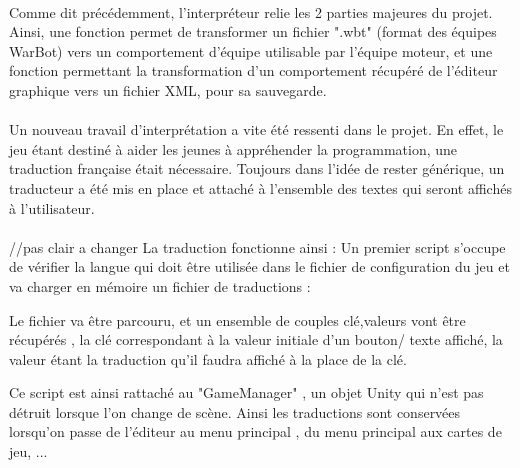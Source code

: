 \documentclass{report}
\begin{document}
\paragraph{}
Comme dit précédemment, l'interpréteur relie les 2 parties majeures du projet.
Ainsi, une fonction permet de transformer un fichier ".wbt" (format des équipes WarBot) vers un comportement d'équipe utilisable par l'équipe moteur, et une fonction permettant la transformation d'un comportement récupéré de l'éditeur graphique vers un fichier XML, pour sa sauvegarde.
\newpage
\paragraph{}
Un nouveau travail d'interprétation a vite été ressenti dans le projet. En effet, le jeu étant destiné à aider les jeunes à appréhender la programmation, une traduction française était nécessaire.
Toujours dans l'idée de rester générique, un traducteur a été mis en place et attaché à l'ensemble des textes qui seront affichés à l'utilisateur.
\paragraph{}
//pas clair a changer
La traduction fonctionne ainsi :
Un premier script s'occupe de vérifier la langue qui doit être utilisée dans le fichier de configuration du jeu et va charger en mémoire un fichier  de traductions : 

Le fichier va être parcouru, et un ensemble de couples clé,valeurs vont être récupérés , la clé correspondant à la valeur initiale d'un bouton/ texte affiché, la valeur étant la traduction qu'il faudra affiché à la place de la clé.

Ce script est ainsi rattaché au "GameManager" , un objet Unity qui n'est pas détruit lorsque l'on change de scène. Ainsi les traductions sont conservées lorsqu'on passe de l'éditeur au menu principal , du menu principal aux cartes de jeu, ...
\end{document}
